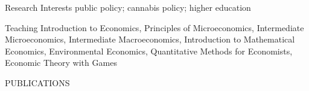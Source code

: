\documentclass{resume}
\begin{document}
	
\vspace{-2mm}





\vspace{-2mm}
\begin{rSection}{Research Interests}
public policy; cannabis policy; higher education
\end{rSection}



\begin{rSection}{Teaching}
Introduction to Economics, Principles of Microeconomics, Intermediate Microeconomics, Intermediate Macroeconomics, Introduction to Mathematical Economics, Environmental Economics, Quantitative Methods for Economists, Economic Theory with Games 

\end{rSection}


\begin{rSection}{PUBLICATIONS} 
\small
\nocite{*}
\renewcommand{\bibsection}{}


\end{rSection}
\end{document}
